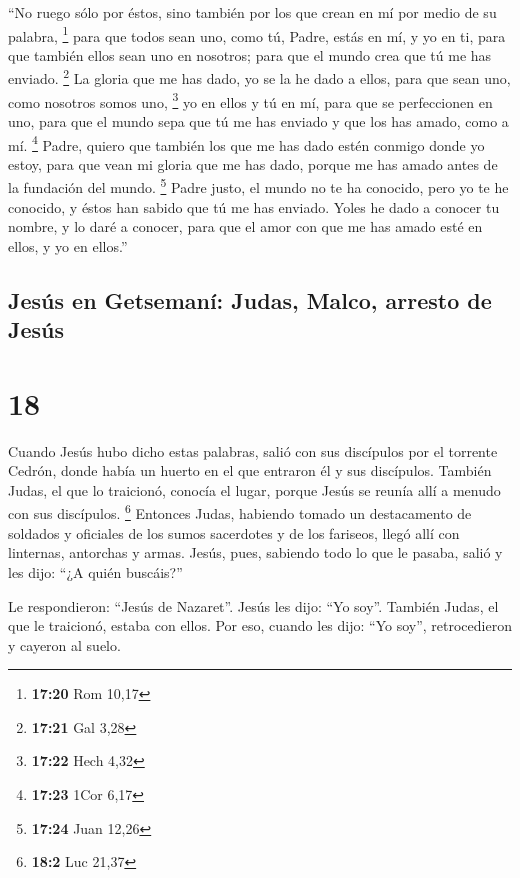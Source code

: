  ``No ruego sólo por éstos, sino también por los que
crean en mí por medio de su palabra, \footnote{\textbf{17:20} Rom 10,17}
 para que todos sean uno, como tú, Padre, estás en mí, y
yo en ti, para que también ellos sean uno en nosotros; para que el mundo
crea que tú me has enviado. \footnote{\textbf{17:21} Gal 3,28}
 La gloria que me has dado, yo se la he dado a ellos,
para que sean uno, como nosotros somos uno, \footnote{\textbf{17:22}
  Hech 4,32}  yo en ellos y tú en mí, para que se
perfeccionen en uno, para que el mundo sepa que tú me has enviado y que
los has amado, como a mí. \footnote{\textbf{17:23} 1Cor 6,17}
 Padre, quiero que también los que me has dado estén
conmigo donde yo estoy, para que vean mi gloria que me has dado, porque
me has amado antes de la fundación del mundo. \footnote{\textbf{17:24}
  Juan 12,26}  Padre justo, el mundo no te ha conocido,
pero yo te he conocido, y éstos han sabido que tú me has enviado.
 Yoles he dado a conocer tu nombre, y lo daré a conocer,
para que el amor con que me has amado esté en ellos, y yo en ellos.''

\hypertarget{jesuxfas-en-getsemanuxed-judas-malco-arresto-de-jesuxfas}{%
\subsection{Jesús en Getsemaní: Judas, Malco, arresto de
Jesús}\label{jesuxfas-en-getsemanuxed-judas-malco-arresto-de-jesuxfas}}

\hypertarget{section-17}{%
\section{18}\label{section-17}}

 Cuando Jesús hubo dicho estas palabras, salió con sus
discípulos por el torrente Cedrón, donde había un huerto en el que
entraron él y sus discípulos.  También Judas, el que lo
traicionó, conocía el lugar, porque Jesús se reunía allí a menudo con
sus discípulos. \footnote{\textbf{18:2} Luc 21,37} 
Entonces Judas, habiendo tomado un destacamento de soldados y oficiales
de los sumos sacerdotes y de los fariseos, llegó allí con linternas,
antorchas y armas.  Jesús, pues, sabiendo todo lo que le
pasaba, salió y les dijo: ``¿A quién buscáis?''

 Le respondieron: ``Jesús de Nazaret''. Jesús les dijo:
``Yo soy''. También Judas, el que le traicionó, estaba con ellos.
 Por eso, cuando les dijo: ``Yo soy'', retrocedieron y
cayeron al suelo.

